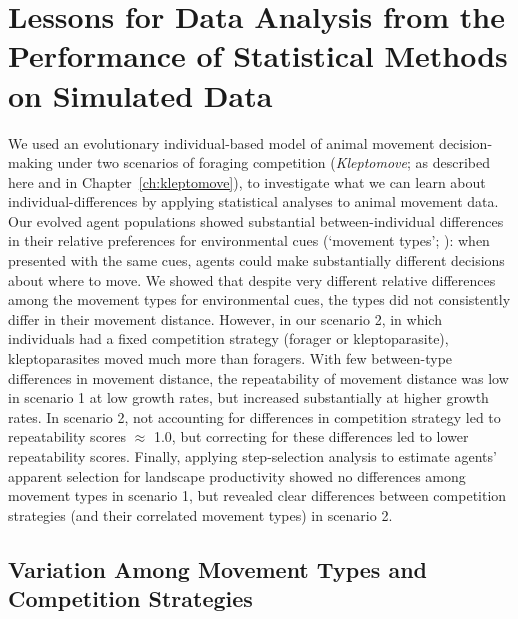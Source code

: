 \section*{Lessons for Data Analysis from the Performance of Statistical Methods on Simulated Data}


We used an evolutionary individual-based model of animal movement decision-making under two scenarios of foraging competition (\textit{Kleptomove}; as described here and in Chapter~\ref{ch:kleptomove}), to investigate what we can learn about individual-differences by applying statistical analyses to animal movement data.
Our evolved agent populations showed substantial between-individual differences in their relative preferences for environmental cues (`movement types'; \citealt{getz2015}): when presented with the same cues, agents could make substantially different decisions about where to move.
We showed that despite very different relative differences among the movement types for environmental cues, the types did not consistently differ in their movement distance.
However, in our scenario 2, in which individuals had a fixed competition strategy (forager or kleptoparasite), kleptoparasites moved much more than foragers.
With few between-type differences in movement distance, the repeatability of movement distance was low in scenario 1 at low growth rates, but increased substantially at higher growth rates.
In scenario 2, not accounting for differences in competition strategy led to repeatability scores $\approx$ 1.0, but correcting for these differences led to lower repeatability scores.
Finally, applying step-selection analysis to estimate agents' apparent selection for landscape productivity showed no differences among movement types in scenario 1, but revealed clear differences between competition strategies (and their correlated movement types) in scenario 2.

\subsection*{Variation Among Movement Types and Competition Strategies}

